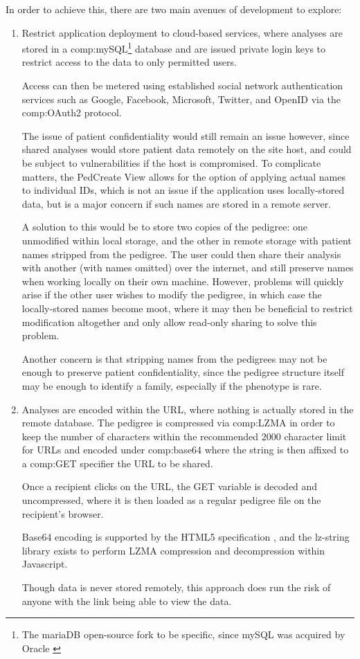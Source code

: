 In order to achieve this, there are two main avenues of development to explore:
\begin{enumerate}
\item{Restrict application deployment to cloud-based services, where analyses are stored in a \gls{comp:mySQL}\footnote{The mariaDB open-source fork to be specific, since mySQL was acquired by Oracle \cite{oraclemysql}} database and are issued private login keys to restrict access to the data to only permitted users.

Access can then be metered using established social network authentication services such as Google, Facebook, Microsoft, Twitter, and OpenID via the \gls{comp:OAuth2} \cite{hardt2012oauth} protocol.

The issue of patient confidentiality would still remain an issue however, since shared analyses would store patient data remotely on the site host, and could be subject to vulnerabilities if the host is compromised.  To complicate matters, the PedCreate View allows for the option of applying actual names to individual IDs, which is not an issue if the application uses locally-stored data, but is a major concern if such names are stored in a remote server.

A solution to this would be to store two copies of the pedigree: one unmodified within local storage, and the other in remote storage with patient names stripped from the pedigree. The user could then share their analysis with another (with names omitted) over the internet, and still preserve names when working locally on their own machine. However, problems will quickly arise if the other user wishes to modify the pedigree, in which case the locally-stored names become moot, where it may then be beneficial to restrict modification altogether and only allow read-only sharing to solve this problem.

Another concern is that stripping names from the pedigrees may not be enough to preserve patient confidentiality, since the pedigree structure itself may be enough to identify a family, especially if the phenotype is rare.
}
\item{Analyses are encoded within the URL, where nothing is actually stored in the remote database. The pedigree is compressed via \gls{comp:LZMA} \cite{lzma} in order to keep the number of characters within the recommended 2000 character limit for URLs \cite{urllength} and encoded under \gls{comp:base64} where the string is then affixed to a \gls{comp:GET} specifier the URL to be shared.

Once a recipient clicks on the URL, the GET variable is decoded and uncompressed, where it is then loaded as a regular pedigree file on the recipient's browser. 

Base64 encoding is supported by the HTML5 specification \cite{masinter1998data}, and the lz-string library exists \cite{lzstring} to perform LZMA compression and decompression within Javascript.

Though data is never stored remotely, this approach does run the risk of anyone with the link being able to view the data.
}
\end{enumerate}

